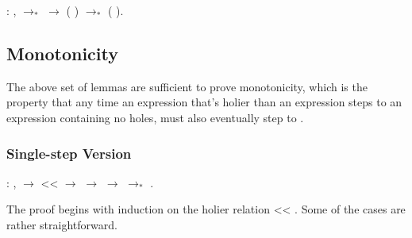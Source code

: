\documentclass[12pt]{report}
\begin{document}
\begin{coqdoccode}
\coqdocemptyline
\coqdocindent{1.00em}
  : \coqdockw{\ensuremath{\forall}}   ,\coqdoceol
\coqdocindent{2.00em}
 $\to_*$  \ensuremath{\rightarrow}\coqdoceol
\coqdocindent{2.00em}
(  ) $\to_*$ (  ).\coqdoceol
\coqdocemptyline
\end{coqdoccode}
\subsection{Monotonicity}



The above set of lemmas are sufficient to prove monotonicity, which
is the property that any time an expression  that's
holier than an expression  steps to an expression
 containing no holes,  must also
eventually step to . 

\subsubsection{Single-step Version}

\begin{coqdoccode}
\coqdocemptyline
\coqdocindent{1.00em}
  : \coqdockw{\ensuremath{\forall}}   ,\coqdoceol
\coqdocindent{2.00em}
  \ensuremath{\rightarrow}\coqdoceol
\coqdocindent{2.00em}
 <<  \ensuremath{\rightarrow}\coqdoceol
\coqdocindent{2.00em}
 $\to$  \ensuremath{\rightarrow}\coqdoceol
\coqdocindent{2.00em}
 $\to_*$ .\coqdoceol
\coqdocemptyline
\end{coqdoccode}

The proof begins with induction on the holier relation 
<< . Some of the cases are rather straightforward. 
\end{document}
